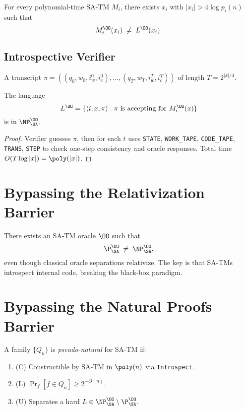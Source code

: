 \documentclass[12pt]{article}
\begin{document}
\begin{lemma}[Diagonalization]
For every polynomial‐time SA‐TM $M_i$, there exists $x_i$ with $|x_i|>4\log p_i(n)$ such that 
\[
M_i^{\OO}(x_i)\;\neq\;L^{\OO}(x_i).
\]
\end{lemma}

\subsection{Introspective Verifier}
\begin{definition}[SA‐Transcript]
A transcript $\pi=((q_0,w_0,i_w^0,i_c^0),\dots,(q_T,w_T,i_w^T,i_c^T))$ of length $T=2^{|x|/4}$.
\end{definition}

\begin{theorem}[$L^{\OO}\in\NP^{\OO}_{\SA}$]
The language 
\[
L^{\OO}=\{\langle i,x,\pi\rangle : \pi\text{ is accepting for }M_i^{\OO}(x)\}
\]
is in $\NP^{\OO}_{\SA}$.
\end{theorem}
\begin{proof}
Verifier guesses $\pi$, then for each $t$ uses \texttt{STATE}, \texttt{WORK\_TAPE}, \texttt{CODE\_TAPE}, \texttt{TRANS}, \texttt{STEP} to check one‐step consistency and oracle responses.  Total time $O(T\log|x|)=\poly(|x|)$.
\end{proof}

\section{Bypassing the Relativization Barrier}
\begin{theorem}
There exists an SA‐TM oracle $\OO$ such that 
\[
\P^{\OO}_{\SA}\;\neq\;\NP^{\OO}_{\SA},
\]
even though classical oracle separations relativize.  The key is that SA‐TMs introspect internal code, breaking the black‐box paradigm.
\end{theorem}

\section{Bypassing the Natural Proofs Barrier}
\begin{definition}
A family $\{Q_n\}$ is \emph{pseudo-natural} for SA‐TM if:
\begin{enumerate}
  \item (C) Constructible by SA‐TM in $\poly(n)$ via \texttt{Introspect}.
  \item (L) $\Pr_{f}[f\in Q_n]\ge2^{-O(n)}$.
  \item (U) Separates a hard $L\in\NP^{\OO}_{\SA}\setminus\P^{\OO}_{\SA}$.
\end{enumerate}
\end{definition}
\end{document}
